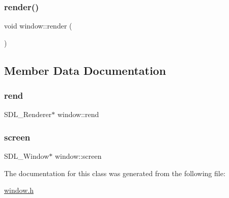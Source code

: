 \mbox{\label{classwindow_a0f16fe01af181d9a953bf8cf8f09ec9b}} 
\subsubsection{\texorpdfstring{render()}{render()}}
{\footnotesize\ttfamily void window\+::render (\begin{DoxyParamCaption}{ }\end{DoxyParamCaption})}



\subsection{Member Data Documentation}
\mbox{\label{classwindow_a1a6f43018b2e8d43531012fd854f74e1}} 
\subsubsection{\texorpdfstring{rend}{rend}}
{\footnotesize\ttfamily S\+D\+L\+\_\+\+Renderer$\ast$ window\+::rend}

\mbox{\label{classwindow_acc676834f8692a998b7346bdd1264ba2}} 
\subsubsection{\texorpdfstring{screen}{screen}}
{\footnotesize\ttfamily S\+D\+L\+\_\+\+Window$\ast$ window\+::screen}



The documentation for this class was generated from the following file\+:\begin{DoxyCompactItemize}
\item 
\hyperlink{window_8h}{window.\+h}\end{DoxyCompactItemize}
